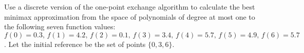 \begin{problem}
  Use a discrete version of the one-point exchange algorithm to
  calculate the best minimax approximation from the space of
  polynomials of degree at most one to the following seven function
  values: $f (0) = 0.3,\, f (1) = 4.2,\, f (2) = 0.1,\, f (3) = 3.4,\, f (4) =
  5.7,\, f (5) = 4.9,\, f (6) = 5.7$. Let the initial reference be the set
  of points $\{0, 3, 6\}$.
\end{problem}

\begin{solution}

\end{solution}

